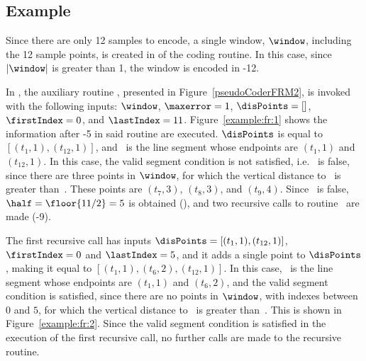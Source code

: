 \vspace{+10pt}





\clearpage
\subsection{Example}
\label{algo:fr:example}


\exampleIntro{\ref{example:fr:1}}


Since there are only 12 samples to encode, a single window, $\window$, including the 12 sample points, is created in  of the coding routine. In this case, since $|\window|$ is greater than 1, the window is encoded in -12. 


In , the auxiliary routine \getDisplacedPointsMethod, presented in Figure~\ref{pseudoCoderFRM2}, is invoked with the following inputs: $\window$, $\maxerror=1$, $\disPoints=[]$, $\firstIndex = 0$, and $\lastIndex = 11$. Figure~\ref{example:fr:1} shows the information after -5 in said routine are executed. $\disPoints$ is equal to $[(t_1,1), (t_{12},1)]$, and \segment\ is the line segment whose endpoints are $(t_1,1)$ and $(t_{12},1)$. In this case, the valid segment condition is not satisfied, i.e. \validSegment\ is false, since there are three points in $\window$, for which the vertical distance to \segment\ is greater than~\maxerror. These points are $(t_7,3)$, $(t_8,3)$, and $(t_9,4)$. Since \validSegment\ is false, $\half=\floor{11/2}=5$ is obtained (), and two recursive calls to routine \getDisplacedPointsMethod\ are made (-9).




The first recursive call has inputs $\disPoints=[(t_1,1), (t_{12},1)]$, $\firstIndex = 0$ and $\lastIndex = 5$, and it adds a single point to $\disPoints$, making it equal to $[(t_1,1), (t_{6},2), (t_{12},1)]$. In this case, \segment\ is the line segment whose endpoints are $(t_1,1)$ and $(t_{6},2)$, and the valid segment condition is satisfied, since there are no points in $\window$, with indexes between $0$ and $5$, for which the vertical distance to \segment\ is greater than~\maxerror. This is shown in Figure~\ref{example:fr:2}. Since the valid segment condition is satisfied in the execution of the first recursive call, no further calls are made to the recursive routine.


